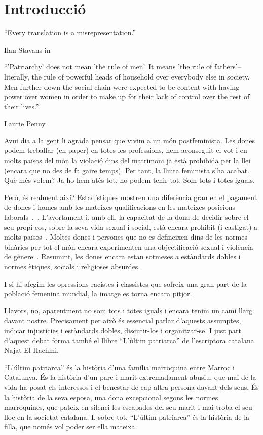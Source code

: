 \section{Introducció}

\epigraph{``Every translation is a misrepresentation.''}{Ilan Stavans in~\autocite{Albin2005}}
\epigraph{``'Patriarchy' does not mean 'the rule of men'. It means 'the rule of fathers'--literally, the rule of powerful heads of household over everybody else in society. Men further down the social chain were expected to be content with having power over women in order to make up for their lack of control over the rest of their lives.''}{Laurie Penny~\autocite[69]{Penny2014}}

Avui dia a la gent li agrada pensar que vivim a un món postfeminista.
Les dones podem treballar (en paper) en totes les professions, hem aconseguit el vot i en molts països del món la violació dins del matrimoni ja està prohibida per la llei (encara que no des de fa gaire temps).
Per tant, la lluita feminista s'ha acabat.
Què més volem?
Ja ho hem atès tot, ho podem tenir tot.
Som tots i totes iguals.

Però, és realment així?
Estadístiques mostren una diferència gran en el pagament de dones i homes amb les mateixes qualificacions en les mateixes posicions laborals~\autocite{EU2014},~\autocite{MDBGH2012}.
L'avortament i, amb ell, la capacitat de la dona de decidir sobre el seu propi cos, sobre la seva vida sexual i social, està encara prohibit (i castigat) a molts països~\autocite{UN2013}.
Moltes dones i persones que no es defineixen dins de les normes binàries per tot el món encara experimenten una objectificació sexual i violència de gènere~\autocite{WHO2016}.
Resumint, les dones encara estan sotmeses a estàndards dobles i normes ètiques, socials i religioses absurdes.

I si hi afegim les opressions racistes i classistes que sofreix una gran part de la població femenina mundial, la imatge es torna encara pitjor.

Llavors, no, aparentment no som tots i totes iguals i encara tenim un camí llarg davant nostre.
Precisament per això és essencial parlar d'aquests assumptes, indicar injustícies i estàndards dobles, discutir-los i organitzar-se.
I just part d'aquest debat forma també el llibre ``L'últim patriarca'' de l'escriptora catalana Najat El Hachmi.

``L'últim patriarca'' és la història d'una família marroquina entre Marroc i Catalunya.
És la història d'un pare i marit extremadament abusiu, que mai de la vida ha posat els interessos i el benestar de cap altra persona davant dels seus.
És la història de la seva esposa, una dona excepcional segons les normes marroquines, que pateix en silenci les escapades del seu marit i mai troba el seu lloc en la societat catalana.
I, sobre tot, ``L'últim patriarca'' és la història de la filla, que només vol poder ser ella mateixa.

